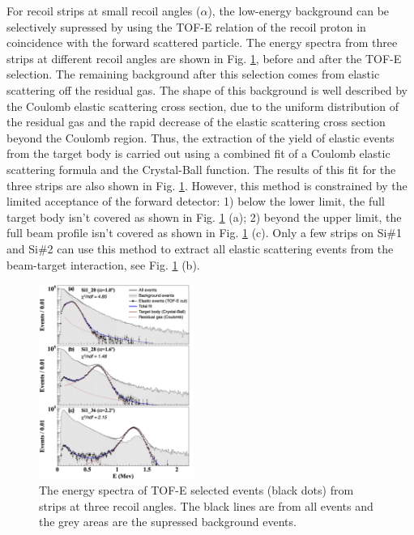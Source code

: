 \documentclass[fleqn,twocolumn,a4paper]{ikpar}
\begin{document}
For recoil strips at small recoil angles ($\alpha$), the low-energy background
can be selectively supressed by using the TOF-E relation of the recoil proton in
coincidence with the forward scattered particle.
The energy spectra from three strips at different recoil angles are shown in
Fig. \ref{fig:coulomb_cb2_fit},  before and after the TOF-E selection.
The remaining background after this selection comes from elastic scattering off the residual gas.
The shape of this background is well described by the Coulomb elastic scattering cross
section, due to the uniform distribution of the residual gas \cite{r2} and the
rapid decrease of the elastic scattering cross section beyond the Coulomb region.
Thus, the extraction of the yield of elastic events from the target body is carried out
using a combined fit of a Coulomb elastic scattering formula and the Crystal-Ball
function.
The results of this fit for the three strips are also shown in Fig. \ref{fig:coulomb_cb2_fit}.
However, this method is constrained by the limited acceptance of the forward detector:
1) below the lower limit, the full target body isn't covered as shown in Fig.
\ref{fig:coulomb_cb2_fit} (a);
2) beyond the upper limit, the full beam profile isn't covered as shown in
Fig. \ref{fig:coulomb_cb2_fit} (c).
Only a few strips on Si\#1 and Si\#2 can use this method to extract all
elastic scattering events from the beam-target interaction, see Fig. \ref{fig:coulomb_cb2_fit} (b).
\begin{figure}[!htb]
	\includegraphics[width=0.45\textwidth]{./coulomb_cb2_fit.png}
  \caption{The energy spectra of TOF-E selected events (black dots) from strips at three
    recoil angles. The black lines are from all events and the grey areas are the
  supressed background events. }
  \label{fig:coulomb_cb2_fit}
\end{figure}
\end{document}
